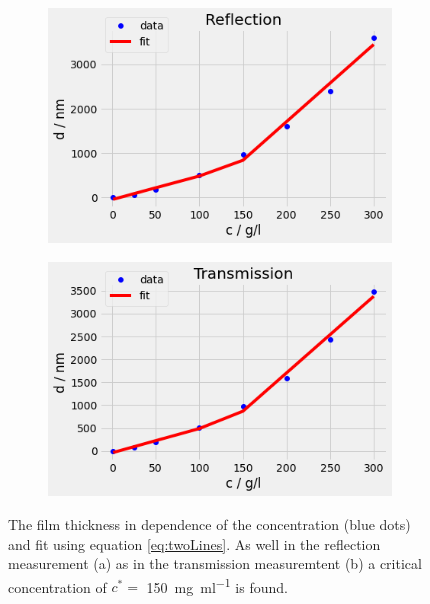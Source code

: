 \begin{figure}[ht]
    \centering
    \begin{subfigure}[b]{0.49\textwidth}
        \centering
        \includegraphics[width = \textwidth]{Bilder/Auswertung/Concentration/ReflFit.png}
    \end{subfigure}  
    \begin{subfigure}[b]{0.49\textwidth}
        \centering
        \includegraphics[width = \textwidth]{Bilder/Auswertung/Concentration/TransFit.png}
    \end{subfigure}  


    \caption{The film thickness in dependence of the concentration (blue dots) and fit using equation \ref{eq:twoLines}. As well in the reflection measurement (a) as in the transmission measuremtent (b) a critical concentration of $c^* =$ \SI{150}{\milli\gram\per\milli\litre} is found.}
    \label{fig:FitConc}
\end{figure}

